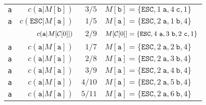 \documentclass{article}
\begin{document}
\begin{tabular}{crrl}
  {\tt a} & $c(\mathtt a|M[\mathtt{b}])$ & $3/5$ & $M[\mathtt{b}]=\{\mathtt{ESC},1~\mathtt{a},4~\mathtt{c},1\}$\\
  {\tt a} & $c(\mathtt{ESC}|M[\mathtt{a}])$ & $1/5$ & $M[\mathtt{a}]=\{\mathtt{ESC},2~\mathtt{a},1~\mathtt{b},4\}$\\
  ~ & $c(\mathtt a|M[{\cal C}[0]])$ & $2/9$ & $M[{\cal C}[0]]=\{\mathtt{ESC},4~\mathtt{a},3~\mathtt{b},2~\mathtt{c},1\}$\\
  {\tt a} & $c(\mathtt a|M[\mathtt{a}])$ & $1/7$ & $M[\mathtt{a}]=\{\mathtt{ESC},2~\mathtt{a},2~\mathtt{b},4\}$\\
  {\tt a} & $c(\mathtt a|M[\mathtt{a}])$ & $2/8$ & $M[\mathtt{a}]=\{\mathtt{ESC},2~\mathtt{a},3~\mathtt{b},4\}$\\
  {\tt a} & $c(\mathtt a|M[\mathtt{a}])$ & $3/9$ & $M[\mathtt{a}]=\{\mathtt{ESC},2~\mathtt{a},4~\mathtt{b},4\}$\\
  {\tt a} & $c(\mathtt a|M[\mathtt{a}])$ & $4/10$ & $M[\mathtt{a}]=\{\mathtt{ESC},2~\mathtt{a},5~\mathtt{b},4\}$\\
  {\tt a} & $c(\mathtt a|M[\mathtt{a}])$ & $5/11$ & $M[\mathtt{a}]=\{\mathtt{ESC},2~\mathtt{a},6~\mathtt{b},4\}$
  \end{tabular}
\end{document}

